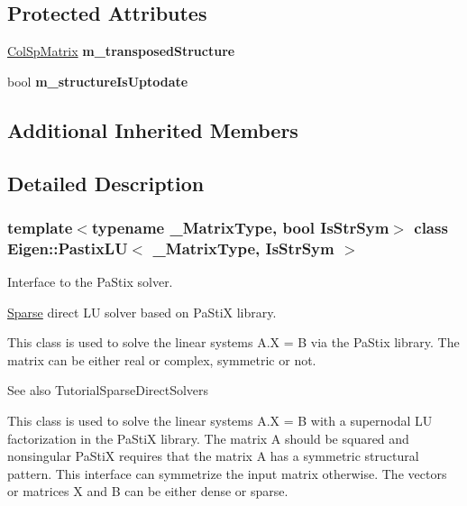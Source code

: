 \subsection*{Protected Attributes}
\begin{DoxyCompactItemize}
\item 
\mbox{\label{class_eigen_1_1_pastix_l_u_adabc5f2985161038c22285816c21ed87}} 
\hyperlink{group___sparse_core___module}{Col\+Sp\+Matrix} {\bfseries m\+\_\+transposed\+Structure}
\item 
\mbox{\label{class_eigen_1_1_pastix_l_u_adbb1af75943a3e0a5155481144533113}} 
bool {\bfseries m\+\_\+structure\+Is\+Uptodate}
\end{DoxyCompactItemize}
\subsection*{Additional Inherited Members}


\subsection{Detailed Description}
\subsubsection*{template$<$typename \+\_\+\+Matrix\+Type, bool Is\+Str\+Sym$>$\newline
class Eigen\+::\+Pastix\+L\+U$<$ \+\_\+\+Matrix\+Type, Is\+Str\+Sym $>$}

Interface to the Pa\+Stix solver. 

\hyperlink{struct_eigen_1_1_sparse}{Sparse} direct LU solver based on Pa\+StiX library.

This class is used to solve the linear systems A.\+X = B via the Pa\+Stix library. The matrix can be either real or complex, symmetric or not.

\begin{DoxySeeAlso}{See also}
Tutorial\+Sparse\+Direct\+Solvers
\end{DoxySeeAlso}
This class is used to solve the linear systems A.\+X = B with a supernodal LU factorization in the Pa\+StiX library. The matrix A should be squared and nonsingular Pa\+StiX requires that the matrix A has a symmetric structural pattern. This interface can symmetrize the input matrix otherwise. The vectors or matrices X and B can be either dense or sparse.


